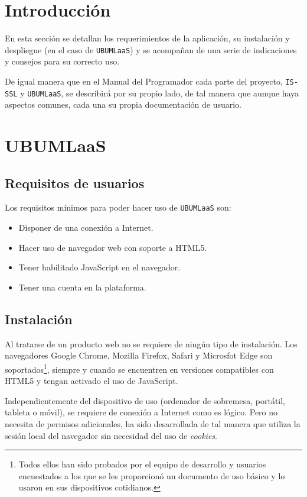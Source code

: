 
\section{Introducción}
En esta sección se detallan los requerimientos de la aplicación, su instalación y despliegue (en el caso de \texttt{UBUMLaaS}) y se acompañan de una serie de indicaciones y consejos para su correcto uso.

De igual manera que en el Manual del Programador cada parte del proyecto, \texttt{IS-SSL} y \texttt{UBUMLaaS}, se describirá por su propio lado, de tal manera que aunque haya aspectos comunes, cada una su propia documentación de usuario.

\section{UBUMLaaS}
\subsection{Requisitos de usuarios}
Los requisitos mínimos para poder hacer uso de \texttt{UBUMLaaS} son:
\begin{itemize}
\item Disponer de una conexión a Internet.
\item Hacer uso de navegador web con soporte a HTML5.
\item Tener habilitado JavaScript en el navegador.
\item Tener una cuenta en la plataforma.
\end{itemize}
\subsection{Instalación}
Al tratarse de un producto web no se requiere de ningún tipo de instalación. Los navegadores Google Chrome, Mozilla Firefox, Safari y Microsfot Edge son soportados\footnote{Todos ellos han sido probados por el equipo de desarrollo y usuarios encuestados a  los que se les proporcionó un documento de uso básico y lo usaron en sus dispositivos cotidianos.}, siempre y cuando se encuentren en versiones compatibles con HTML5 y tengan activado el uso de JavaScript.

Independientemente del dispositivo de uso (ordenador de sobremesa, portátil, tableta o móvil), se requiere de conexión a Internet como es lógico. Pero no necesita de permisos adicionales, ha sido desarrollada de tal manera que utiliza la sesión local del navegador sin necesidad del uso de \textit{cookies}.

